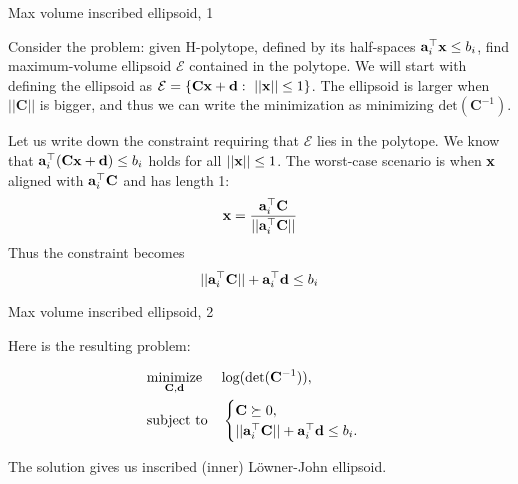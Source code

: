 \documentclass{beamer}
\begin{document}
\begin{frame}{Max volume inscribed ellipsoid, 1}
	\begin{flushleft}
		
		Consider the problem: given H-polytope, defined by its half-spaces $\mathbf{a}_i^\top \mathbf{x} \leq b_i$, find maximum-volume ellipsoid $\mathcal{E}$ contained in the polytope. We will start with defining the ellipsoid as $\mathcal{E} = \{ \mathbf{C}\mathbf{x} + \mathbf{d}: \ || \mathbf{x} || \leq 1 \}$. The ellipsoid is larger when $|| \mathbf{C} ||$ is bigger, and thus we can write the minimization as minimizing $\text{det} (\mathbf{C}^{-1}) $.
		
		\bigskip
		
		Let us write down the constraint requiring that $\mathcal{E}$ lies in the polytope. We know that $\mathbf{a}_i^\top (\mathbf{C}\mathbf{x} + \mathbf{d}) \leq b_i$ holds for all $|| \mathbf{x} || \leq 1$. The worst-case scenario is when $\mathbf{x}$ aligned with $\mathbf{a}_i^\top \mathbf{C}$ and has length 1:
		\begin{equation}
			\mathbf{x} = \frac{\mathbf{a}_i^\top \mathbf{C}}{|| \mathbf{a}_i^\top \mathbf{C} ||}
		\end{equation}
		Thus the constraint becomes
		\begin{equation}
			 || \mathbf{a}_i^\top \mathbf{C} || + \mathbf{a}_i^\top\mathbf{d} \leq b_i
		\end{equation}
		
	\end{flushleft}
\end{frame}



\begin{frame}{Max volume inscribed ellipsoid, 2}
	\begin{flushleft}
		
		Here is the resulting problem:
		
		\begin{equation}
			\begin{aligned}
				& \underset{\mathbf{C}, \mathbf{d}}{\text{minimize}}
				& & \text{log} (\text{det} (\mathbf{C}^{-1}) ), \\
				& \text{subject to}
				& & \begin{cases}
					\mathbf{C} \succeq 0, \\
					|| \mathbf{a}_i^\top \mathbf{C} || + \mathbf{a}_i^\top\mathbf{d} \leq b_i.
				\end{cases}
			\end{aligned}
		\end{equation}
		
		The solution gives us inscribed (inner) L\"owner-John ellipsoid.
		
	\end{flushleft}
\end{frame}
\end{document}
